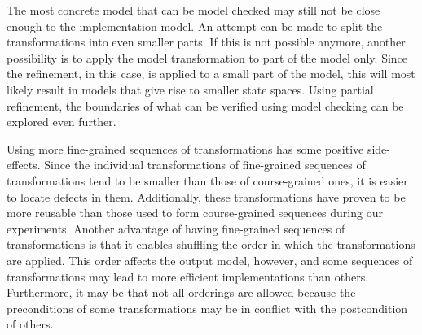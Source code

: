 The most concrete model that can be model checked may still not be close enough to the implementation model.
An attempt can be made to split the transformations into even smaller parts.
If this is not possible anymore, another possibility is to apply the model transformation to part of the model only.
Since the refinement, in this case, is applied to a small part of the model, this will most likely result in models that give rise to smaller state spaces.
Using partial refinement, the boundaries of what can be verified using model checking can be explored even further.

Using more fine-grained sequences of transformations has some positive side-effects.
Since the individual transformations of fine-grained sequences of transformations tend to be smaller than those of course-grained ones, it is easier to locate defects in them.
Additionally, these transformations have proven to be more reusable than those used to form course-grained sequences during our experiments.
Another advantage of having fine-grained sequences of transformations is that it enables shuffling the order in which the transformations are applied.
This order affects the output model, however, and some sequences of transformations may lead to more efficient implementations than others.
Furthermore, it may be that not all orderings are allowed because the preconditions of some transformations may be in conflict with the postcondition of others. 